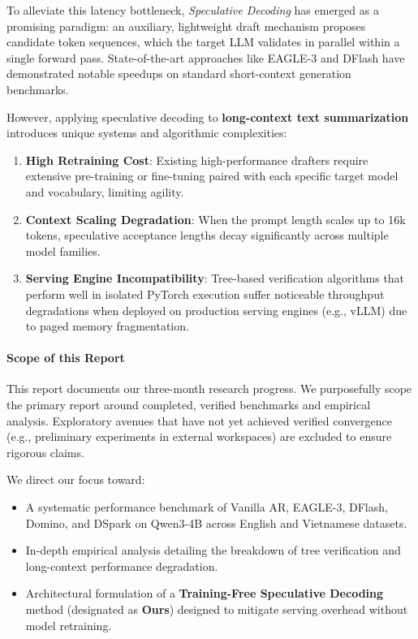 \documentclass[11pt]{article}
\begin{document}
To alleviate this latency bottleneck, \textit{Speculative Decoding} \citep{leviathan2023fast,chen2023accelerating} has emerged as a promising paradigm: an auxiliary, lightweight draft mechanism proposes candidate token sequences, which the target LLM validates in parallel within a single forward pass. State-of-the-art approaches like EAGLE-3 \citep{li2024eagle} and DFlash \citep{zhang2024dflash} have demonstrated notable speedups on standard short-context generation benchmarks.

However, applying speculative decoding to \textbf{long-context text summarization} introduces unique systems and algorithmic complexities:
\begin{enumerate}
    \item \textbf{High Retraining Cost}: Existing high-performance drafters require extensive pre-training or fine-tuning paired with each specific target model and vocabulary, limiting agility.
    \item \textbf{Context Scaling Degradation}: When the prompt length scales up to 16k tokens, speculative acceptance lengths decay significantly across multiple model families.
    \item \textbf{Serving Engine Incompatibility}: Tree-based verification algorithms that perform well in isolated PyTorch execution suffer noticeable throughput degradations when deployed on production serving engines (e.g., vLLM) due to paged memory fragmentation.
\end{enumerate}

\paragraph{Scope of this Report}
This report documents our three-month research progress. We purposefully scope the primary report around completed, verified benchmarks and empirical analysis. Exploratory avenues that have not yet achieved verified convergence (e.g., preliminary experiments in external workspaces) are excluded to ensure rigorous claims. 

We direct our focus toward:
\begin{itemize}
    \item A systematic performance benchmark of Vanilla AR, EAGLE-3, DFlash, Domino, and DSpark on Qwen3-4B across English and Vietnamese datasets.
    \item In-depth empirical analysis detailing the breakdown of tree verification and long-context performance degradation.
    \item Architectural formulation of a \textbf{Training-Free Speculative Decoding} method (designated as \textbf{Ours}) designed to mitigate serving overhead without model retraining.
\end{itemize}
\end{document}
